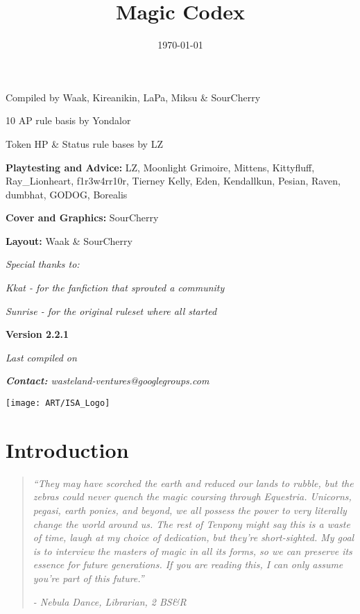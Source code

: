 \documentclass[11pt,a4paper,twocolumn]{book}
\title{Magic Codex}
\date{\today}
\begin{document}
	
			
	\onecolumn
	\setcounter{page}{1}	
\begin{center}
	Compiled by Waak, Kireanikin, LaPa, Miksu \& SourCherry
	
	10 AP rule basis by Yondalor
	
	Token HP \& Status rule bases by LZ
	
	\bigskip		
	\textbf{Playtesting and Advice:} LZ, Moonlight Grimoire, Mittens, Kittyfluff, Ray\_Lionheart, f1r3w4rr10r, Tierney Kelly, Eden, Kendallkun, Pesian, Raven, dumbhat, GODOG, Borealis
	
	\bigskip
	\textbf{Cover and Graphics:} SourCherry
	
	\bigskip
	\textbf{Layout:} Waak \& SourCherry
	
	\bigskip
	\emph{	Special thanks to:}
	
	\emph{	Kkat - for the fanfiction that sprouted a community}
	
	\emph{	Sunrise - for the original ruleset where all started}
\end{center}


\vfill

\begin{center}
	\textbf{Version 2.2.1}
	
	\emph{Last compiled on \thedate}
	
	\emph{\textbf{Contact:} wasteland-ventures@googlegroups.com}
	
\end{center}	
\begin{figure*}[bp]
	\centering
	\texttt{[image: ART/ISA\_Logo]}
\end{figure*}

\twocolumn
\tableofcontents

%

\chapter{Introduction}
\begin{quote}
	\emph{``They may have scorched the earth and reduced our lands to rubble, but the zebras could never quench the magic coursing through Equestria. Unicorns, pegasi, earth ponies, and beyond, we all possess the power to very literally change the world around us. The rest of Tenpony might say this is a waste of time, laugh at my choice of dedication, but they're short-sighted. My goal is to interview the masters of magic in all its forms, so we can preserve its essence for future generations. If you are reading this, I can only assume you're part of this future.''}
	
	\emph{- Nebula Dance, Librarian, 2 BS\&R}
\end{quote}
\end{document}
